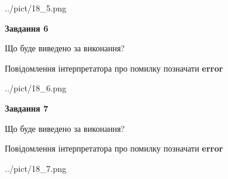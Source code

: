 \documentclass[10pt, ukrainian]{article}
\begin{document}
{\begin {large}
\begin{center}
	{../pict/18_5.png}
\end{center}
\newpage

{\begin {center}\textbf{Завдання 6}\end {center}}\par
Що буде виведено за виконання? \par
Повідомлення інтерпретатора про помилку позначати \textbf{error}

\begin{center}
	{../pict/18_6.png}
\end{center}
\newpage

{\begin {center}\textbf{Завдання 7}\end {center}}\par
Що буде виведено за виконання? \par
Повідомлення інтерпретатора про помилку позначати \textbf{error}

\begin{center}
	{../pict/18_7.png}
\end{center}
\newpage

\end {large}}
\end{document}

